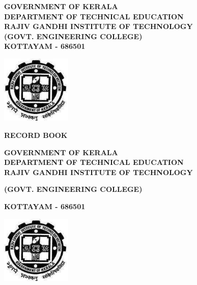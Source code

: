 \begin{titlepage}
\centering

\textbf{\Large GOVERNMENT OF KERALA}\\
\vspace{0.85cm}
\textbf{\Large DEPARTMENT OF TECHNICAL EDUCATION}\\
\vspace{1.5cm}
\textbf{\Large RAJIV GANDHI INSTITUTE OF TECHNOLOGY}\\
\vspace{0.85cm}
\textbf{\Large (GOVT. ENGINEERING COLLEGE)}\\
\vspace{0.85cm}
\textbf{\Large KOTTAYAM - 686501}
\vspace{5.35cm}

\centerline{\includegraphics[width=0.25\textwidth]{rit.png}} %

\vspace{6.5cm}

\textbf{\Large RECORD BOOK}

\newpage
\null
\thispagestyle{empty}

\newpage
\thispagestyle{empty} 
\vspace{-2cm}
\textbf{\Large GOVERNMENT OF KERALA}\\
\vspace{0.9cm}
\textbf{\Large DEPARTMENT OF TECHNICAL EDUCATION}\\
\vspace{0.9cm}
\textbf{\Large RAJIV GANDHI INSTITUTE OF TECHNOLOGY}\\
\vspace{0.9cm}

\textbf{\Large (GOVT. ENGINEERING COLLEGE)}\\
\vspace{0.9cm}

\textbf{\Large KOTTAYAM - 686501}

\vspace{0.5cm}
\centerline{\includegraphics[width=0.25\textwidth]{rit.png}} %
\vspace{1.5cm}


\end{titlepage}
